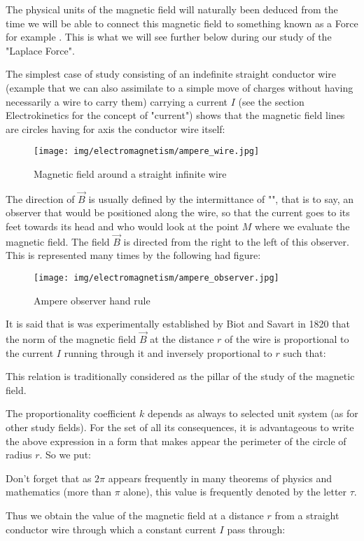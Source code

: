	The physical units of the magnetic field will naturally been deduced from the time we will be able to connect this magnetic field to something known as a Force for example . This is what we will see further below during our study of the "Laplace Force".
	
	The simplest case of study consisting of an indefinite straight conductor wire (example that we can also assimilate to a simple move of charges without having necessarily a wire to carry them) carrying a current $I$ (see the section Electrokinetics for the concept of "current") shows that the magnetic field lines are circles having for axis the conductor wire itself:
	\begin{figure}[H]
		\centering
		\texttt{[image: img/electromagnetism/ampere\_wire.jpg]}
		\caption{Magnetic field around a straight infinite wire}
	\end{figure}
	The direction of $\vec{B}$ is usually defined by the intermittance of "", that is to say, an observer that would be positioned along the wire, so that the current goes to its feet towards its head and who would look at the point $M$ where we evaluate the magnetic field. The field $\vec{B}$ is directed from the right to the left of this observer. This is represented many times by the following had figure:
	\begin{figure}[H]
		\centering
		\texttt{[image: img/electromagnetism/ampere\_observer.jpg]}
		\caption{Ampere observer hand rule}
	\end{figure}
	It is said that is was experimentally established by Biot and Savart in 1820 that the norm of the magnetic field $\vec{B}$ at the distance $r$ of the wire is proportional to the current $I$ running through it and inversely proportional to $r$ such that:
	
	This relation is traditionally considered as the pillar of the study of the magnetic field.
	
	The proportionality coefficient $k$ depends as always to selected unit system (as for other study fields). For the set of all its consequences, it is advantageous to write the above expression in a form that makes appear the perimeter of the circle of radius $r$. So we put:
	
	\begin{tcolorbox}[title=Remark,colframe=black,arc=10pt]
	Don't forget that as $2\pi$ appears frequently in many theorems of physics and mathematics (more than $\pi$ alone), this value is frequently denoted by the letter $\tau$.
	\end{tcolorbox}
	Thus we obtain the value of the magnetic field at a distance $r$ from a straight conductor wire through which a constant current $I$ pass through:
	
